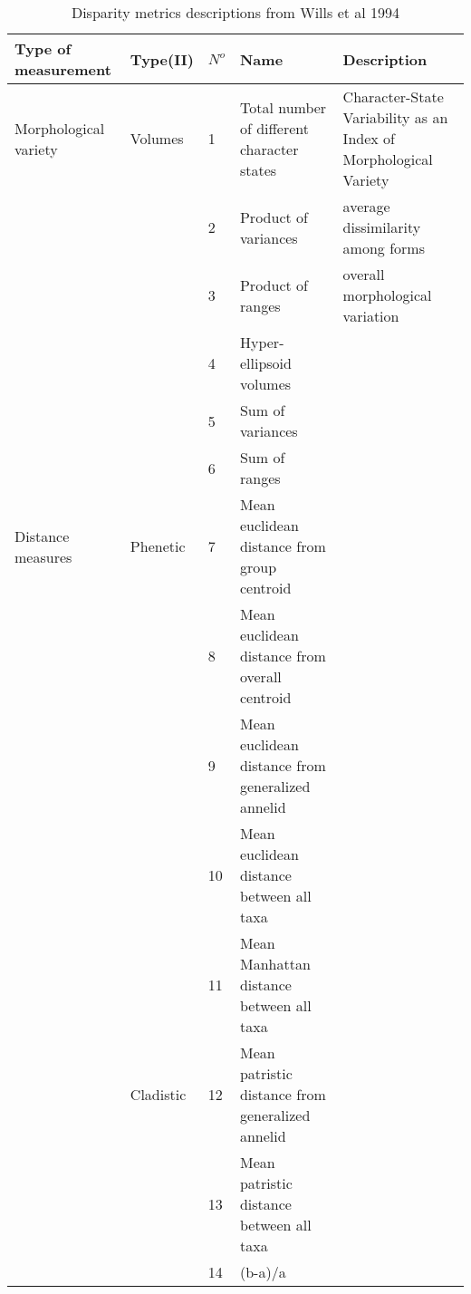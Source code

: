 \documentclass[12pt,letterpaper]{article}
\begin{document}
\begin{landscape}
\begin{table}[H]
\caption{Disparity metrics descriptions from Wills et al 1994}
\centering
\begin{tabular}{p{4.5cm}p{2cm}p{1cm}p{10cm}p{6cm}}
  \hline
    Type of measurement & Type(II) & $N^o$ & Name & Description \\ %
  \hline
  Morphological variety & Volumes   & 1  & Total number of different character states       & Character-State Variability as an Index of Morphological Variety \\
                        &           & 2  & Product of variances                             & average dissimilarity among forms \\
                        &           & 3  & Product of ranges                                & overall morphological variation\\
                        &           & 4  & Hyper-ellipsoid volumes                          & \\
                        &           & 5  & Sum of variances                                 & \\
                        &           & 6  & Sum of ranges                                    & \\
  Distance measures     & Phenetic  & 7  & Mean euclidean distance from group centroid      & \\
                        &           & 8  & Mean euclidean distance from overall centroid    & \\
                        &           & 9  & Mean euclidean distance from generalized annelid & \\
                        &           & 10 & Mean euclidean distance between all taxa         & \\
                        &           & 11 & Mean Manhattan distance between all taxa         & \\
                        & Cladistic & 12 & Mean patristic distance from generalized annelid & \\
                        &           & 13 & Mean patristic distance between all taxa         & \\  
                        &           & 14 & (b-a)/a                                          & \\                          
  \hline
\end{tabular}
\end{table}
\end{landscape}
\end{document}
